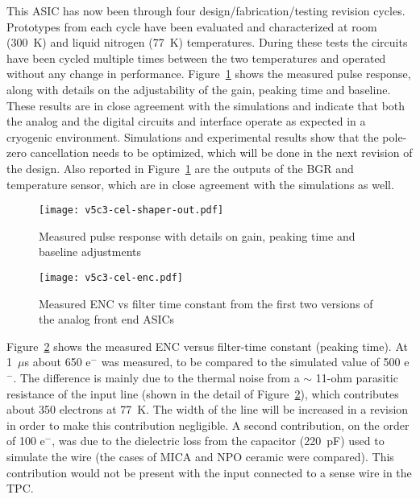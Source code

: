 This ASIC has now been through four design/fabrication/testing revision cycles.
Prototypes from each cycle have been evaluated and characterized at room (300~K) and liquid nitrogen (77~K) temperatures.
During these tests the circuits have been cycled multiple times
between the two temperatures and operated without any change in performance.
Figure~\ref{fig:ce-elec-shaper-out} shows the measured pulse response, along with
details on the adjustability of the gain, peaking time and baseline.
These results are in close agreement with the simulations and indicate
that both the analog and the digital circuits and interface operate as
expected in a cryogenic environment.
Simulations and experimental results show that the pole-zero cancellation needs to be optimized,
which will be done in the next revision of the design.
Also reported in Figure~\ref{fig:ce-elec-shaper-out} are the outputs of the BGR and temperature sensor,
which are in close agreement with the simulations as well.

\begin{figure}[htbp]
\centering
\texttt{[image: v5c3-cel-shaper-out.pdf]}
\caption[Measured pulse response with details]{Measured pulse response with details on gain, peaking time and baseline adjustments}
\label{fig:ce-elec-shaper-out}
\end{figure}

\begin{figure}[htbp]
\centering
\texttt{[image: v5c3-cel-enc.pdf]}
\caption[Measured ENC vs filter time constant]{Measured ENC vs filter time constant from the first two versions of the analog front end ASICs}
\label{fig:ce-elec-enc}
\end{figure}

Figure~\ref{fig:ce-elec-enc} shows the measured ENC versus filter-time constant (peaking time).
At 1~$\mu$s about 650 e$^{-}$ was measured,
to be compared to the simulated value of 500 e$^{-}$. The difference is
mainly due to the thermal noise from a $\sim$
11-ohm parasitic resistance of the input
line (shown in the detail of Figure~\ref{fig:ce-elec-enc}), which contributes about 350
electrons at 77~K. The width of the line will be increased in a
revision in order to make this contribution negligible. A second
contribution, on the order of 100 e$^{-}$, was due to the dielectric
loss from the  capacitor (220~pF) used to simulate the wire (the cases of MICA and NPO ceramic were compared). This contribution would not be
present with the input connected to a sense wire in the TPC.

